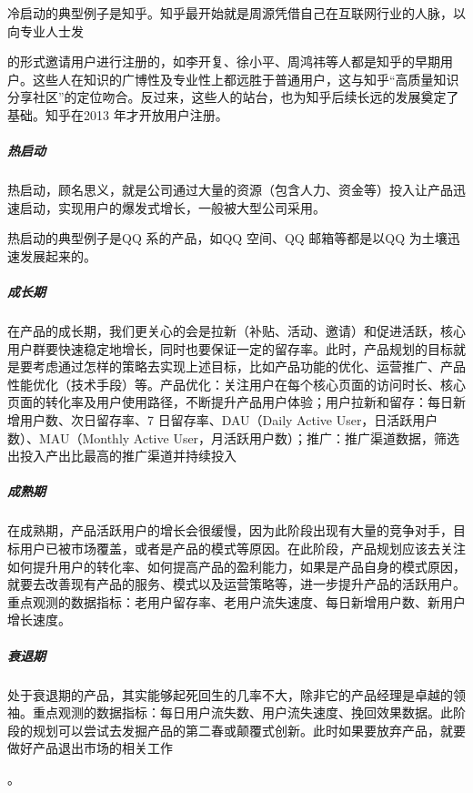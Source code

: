 \documentclass[letterpaper,11pt,english]{sphinxmanual}
\begin{document}
冷启动的典型例子是知乎。知乎最开始就是周源凭借自己在互联网行业的人脉，以向专业人士发%
\begin{footnote}[85]\sphinxAtStartFootnote
{}
%
\end{footnote}的形式邀请用户进行注册的，如李开复、徐小平、周鸿祎等人都是知乎的早期用户。这些人在知识的广博性及专业性上都远胜于普通用户，这与知乎“高质量知识分享社区”的定位吻合。反过来，这些人的站台，也为知乎后续长远的发展奠定了基础。知乎在2013
年才开放用户注册。


\subparagraph{热启动}
\label{\detokenize{chapter_introduction/2C:id16}}
热启动，顾名思义，就是公司通过大量的资源（包含人力、资金等）投入让产品迅速启动，实现用户的爆发式增长，一般被大型公司采用。

热启动的典型例子是QQ 系的产品，如QQ 空间、QQ 邮箱等都是以QQ
为土壤迅速发展起来的。%
\begin{footnote}[86]\sphinxAtStartFootnote
{}
%
\end{footnote}


\subparagraph{成长期}
\label{\detokenize{chapter_introduction/2C:id17}}
在产品的成长期，我们更关心的会是拉新（补贴、活动、邀请）和促进活跃，核心用户群要快速稳定地增长，同时也要保证一定的留存率。此时，产品规划的目标就是要考虑通过怎样的策略去实现上述目标，比如产品功能的优化、运营推广、产品性能优化（技术手段）等。产品优化：关注用户在每个核心页面的访问时长、核心页面的转化率及用户使用路径，不断提升产品用户体验；用户拉新和留存：每日新增用户数、次日留存率、7
日留存率、DAU（Daily Active User，日活跃用户数）、MAU（Monthly Active
User，月活跃用户数）；推广：推广渠道数据，筛选出投入产出比最高的推广渠道并持续投入


\subparagraph{成熟期}
\label{\detokenize{chapter_introduction/2C:id18}}
在成熟期，产品活跃用户的增长会很缓慢，因为此阶段出现有大量的竞争对手，目标用户已被市场覆盖，或者是产品的模式等原因。在此阶段，产品规划应该去关注如何提升用户的转化率、如何提高产品的盈利能力，如果是产品自身的模式原因，就要去改善现有产品的服务、模式以及运营策略等，进一步提升产品的活跃用户。重点观测的数据指标：老用户留存率、老用户流失速度、每日新增用户数、新用户增长速度。


\subparagraph{衰退期}
\label{\detokenize{chapter_introduction/2C:id19}}
处于衰退期的产品，其实能够起死回生的几率不大，除非它的产品经理是卓越的领袖。重点观测的数据指标：每日用户流失数、用户流失速度、挽回效果数据。此阶段的规划可以尝试去发掘产品的第二春或颠覆式创新。此时如果要放弃产品，就要做好产品退出市场的相关工作
%
\begin{footnote}[87]\sphinxAtStartFootnote
{}
%
\end{footnote}。
\end{document}
